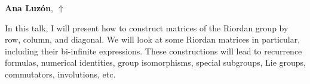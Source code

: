 \documentclass[ILAS2025-program.tex]{subfiles}
\begin{document}
\hypertarget{down0413}{}\begin{ilasabstract}
    
\textbf{Ana Luzón},  \hfill \hyperlink{up0413}{$\Uparrow$}
    
    
\mtskip
    \begin{bibunit}
        In this talk, I will present how to construct matrices of the Riordan group by row, column, and diagonal. We will look at some Riordan matrices in particular, including their bi-infinite expressions. These constructions will lead to recurrence formulas, numerical identities, group isomorphisms, special subgroups, Lie groups,  commutators, involutions, etc.

%
%
%
%
%
%
%
%
%
%
%
%


        \end{bibunit}
        
\end{ilasabstract}
    
\end{document}
